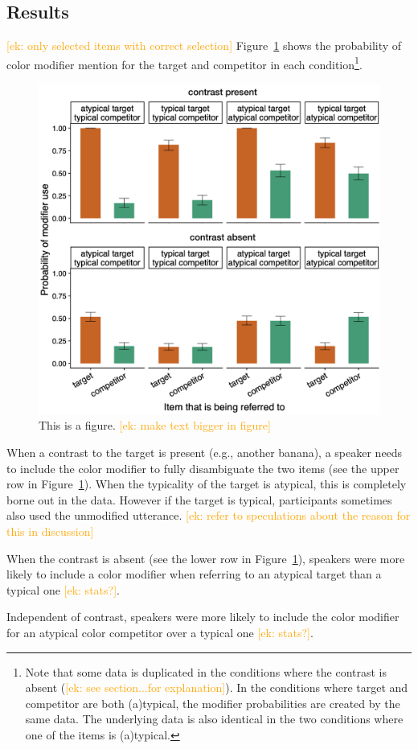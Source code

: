 \documentclass[10pt,letterpaper]{article}
\newcommand{\ek}[1]{\textcolor{Orange}{[ek: #1]}}
\begin{document}
\subsection{Results}
\ek{only selected items with correct selection}
Figure~\ref{prod-results} shows the probability of color modifier mention for the target and competitor in each condition\footnote{Note that some data is duplicated in the conditions where the contrast is absent (\ek{see section...for explanation}). In the conditions where target and competitor are both (a)typical, the modifier probabilities are created by the same data. The underlying data is also identical in the two conditions where one of the items is (a)typical.}. 

\begin{figure}
	\begin{center}
		\includegraphics[width=.45\textwidth]{graphs/prod-bycond-paper.pdf}
	\end{center}
\caption{This is a figure. \ek{make text bigger in figure}} 
\label{prod-results}
\end{figure}

When a contrast to the target is present (e.g., another banana), a speaker needs to include the color modifier to fully disambiguate the two items (see the upper row in Figure~\ref{prod-results}). When the typicality of the target is atypical, this is completely borne out in the data. However if the target is typical, participants sometimes also used the unmodified utterance. \ek{refer to speculations about the reason for this in discussion} 

When the contrast is absent (see the lower row in Figure~\ref{prod-results}), speakers were more likely to include a color modifier when referring to an atypical target than a typical one \ek{stats?}.

Independent of contrast, speakers were more likely to include the color modifier for an atypical color competitor over a typical one \ek{stats?}.
\end{document}
